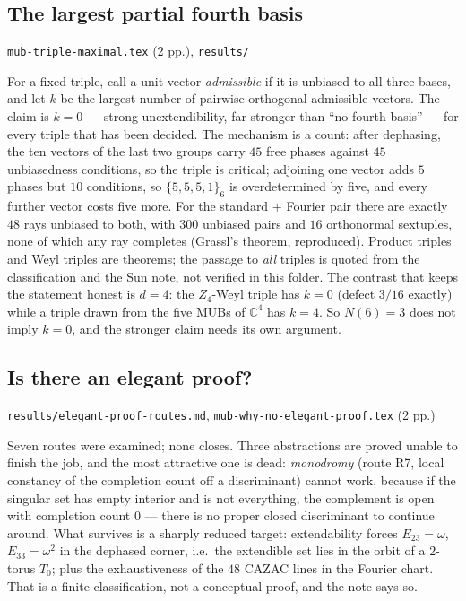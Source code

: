 \documentclass[10pt]{article}
\theoremstyle{definition}
\newcommand{\C}{\mathbb{C}}
\newcommand{\file}[1]{\texttt{\small #1}}
\begin{document}
\subsection{The largest partial fourth basis}
\file{mub-\allowbreak{}triple-\allowbreak{}maximal.tex} (2 pp.), \file{results/\allowbreak{}}

For a fixed triple, call a unit vector \emph{admissible} if it is unbiased to all three bases, and let
$k$ be the largest number of pairwise orthogonal admissible vectors. The claim is $k=0$ --- strong
unextendibility, far stronger than ``no fourth basis'' --- for every triple that has been decided.
The mechanism is a count: after dephasing, the ten vectors of the last two groups carry $45$ free
phases against $45$ unbiasedness conditions, so the triple is critical; adjoining one vector adds $5$
phases but $10$ conditions, so $\{5,5,5,1\}_6$ is overdetermined by five, and every further vector
costs five more. For the standard $+$ Fourier pair there are exactly $48$ rays unbiased to both, with
$300$ unbiased pairs and $16$ orthonormal sextuples, none of which any ray completes (Grassl's theorem,
reproduced). Product triples and Weyl triples are theorems; the passage to \emph{all} triples is
quoted from the classification and the Sun note, not verified in this folder. The contrast that keeps
the statement honest is $d=4$: the $Z_4$-Weyl triple has $k=0$ (defect $3/16$ exactly) while a triple
drawn from the five MUBs of $\C^4$ has $k=4$. So $N(6)=3$ does not imply $k=0$, and the stronger claim
needs its own argument.

\subsection{Is there an elegant proof?}
\file{results/\allowbreak{}elegant-\allowbreak{}proof-\allowbreak{}routes.md}, \file{mub-\allowbreak{}why-\allowbreak{}no-\allowbreak{}elegant-\allowbreak{}proof.tex} (2 pp.)

Seven routes were examined; none closes. Three abstractions are proved unable to finish the job, and
the most attractive one is dead: \emph{monodromy} (route R7, local constancy of the completion count
off a discriminant) cannot work, because if the singular set has empty interior and is not everything,
the complement is open with completion count $0$ --- there is no proper closed discriminant to
continue around. What survives is a sharply reduced target: extendability forces $E_{23}=\omega$,
$E_{33}=\omega^2$ in the dephased corner, i.e.\ the extendible set lies in the orbit of a $2$-torus
$T_0$; plus the exhaustiveness of the $48$ CAZAC lines in the Fourier chart. That is a finite
classification, not a conceptual proof, and the note says so.
\end{document}
